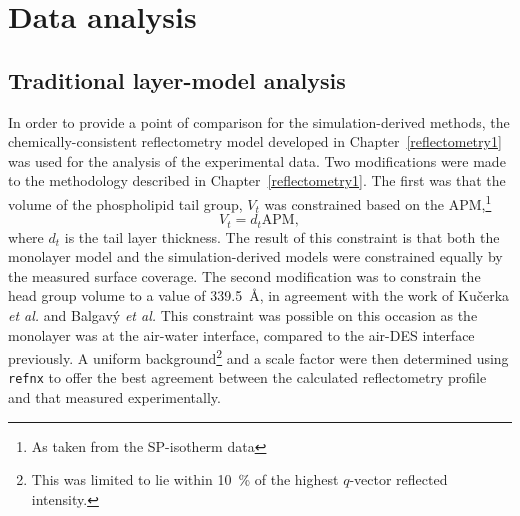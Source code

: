 \section{Data analysis}
\subsection{Traditional layer-model analysis}
In order to provide a point of comparison for the simulation-derived methods, the chemically-consistent reflectometry model developed in Chapter~\ref{reflectometry1} was used for the analysis of the experimental data.
Two modifications were made to the methodology described in Chapter~\ref{reflectometry1}.
The first was that the volume of the phospholipid tail group, $V_t$ was constrained based on the APM,\footnote{As taken from the SP-isotherm data}
%
\begin{equation}
V_t = d_t\text{APM},
\end{equation}
%
where $d_t$ is the tail layer thickness.
The result of this constraint is that both the monolayer model and the simulation-derived models were constrained equally by the measured surface coverage.
The second modification was to constrain the head group volume to a value of \SI{339.5}{\angstrom}, in agreement with the work of Ku\v{c}erka \emph{et al.} and Balgav\'{y} \emph{et al.}
This constraint was possible on this occasion as the monolayer was at the air-water interface, compared to the air-DES interface previously.
A uniform background\footnote{This was limited to lie within \SI{10}{\percent} of the highest $q$-vector reflected intensity.} and a scale factor were then determined using \texttt{refnx} to offer the best agreement between the calculated reflectometry profile and that measured experimentally.

